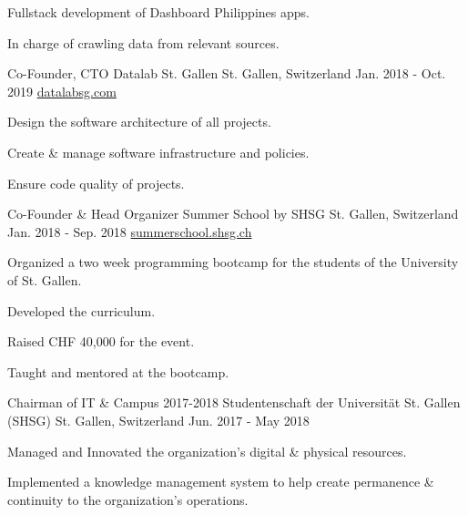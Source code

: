 \begin{cventries}
{\begin{cvitems}
      \item {Fullstack development of Dashboard Philippines apps.}
      \item {In charge of crawling data from relevant sources.}
      \end{cvitems}
    }
  \cventry
    {Co-Founder, CTO} %
    {Datalab St. Gallen} %
    {St. Gallen, Switzerland} %
    {Jan. 2018 - Oct. 2019} %
    {\href{https://datalabsg.com}{datalabsg.com}} %
    {
      \begin{cvitems} %
      \item {Design the software architecture of all projects.}
      \item {Create \& manage software infrastructure and policies.}
      \item {Ensure code quality of projects.}
      \end{cvitems}
    }
  \cventry
    {Co-Founder \& Head Organizer} %
    {Summer School by SHSG} %
    {St. Gallen, Switzerland} %
    {Jan. 2018 - Sep. 2018} %
    {\href{https://summerschool.shsg.ch}{summerschool.shsg.ch}} %
    {
      \begin{cvitems} %
      \item {Organized a two week programming bootcamp for the students of the University of St. Gallen.}
      \item {Developed the curriculum.}
      \item {Raised CHF 40,000 for the event.}
      \item {Taught and mentored at the bootcamp.}
      \end{cvitems}
    }
  \cventry
    {Chairman of IT \& Campus 2017-2018} %
    {Studentenschaft der Universität St. Gallen (SHSG)} %
    {St. Gallen, Switzerland} %
    {Jun. 2017 - May 2018} %
    {} %
    {
      \begin{cvitems} %
        \item {Managed and Innovated the organization's digital \& physical resources.}
        \item {Implemented a knowledge management system to help create permanence \& continuity to the organization's operations.}

\end{cvitems}}
\end{cventries}

